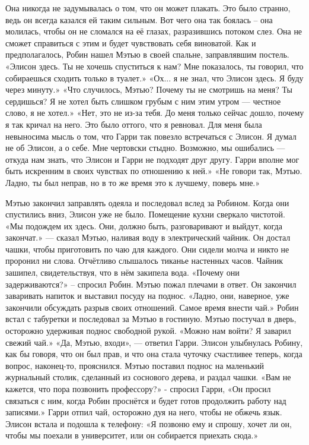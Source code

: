 \documentclass[a4paper,12pt]{book}
\begin{document}
	Она никогда не задумывалась о том, что он может плакать. Это было странно, ведь он всегда казался ей таким сильным. Вот чего она так боялась – она молилась, чтобы он не сломался на её глазах,  разразившись потоком слез. Она не сможет справиться с этим и будет чувствовать себя виноватой.
	Как и предполагалось, Робин нашел Мэтью в своей спальне, заправлявшим постель.
	«Элисон здесь. Ты не хочешь спуститься к нам? Мне показалось, ты говорил, что собираешься сходить только в туалет.»
	«Ох... я не знал, что Элисон здесь. Я буду через минуту.»
	«Что случилось, Мэтью? Почему ты не смотришь на меня? Ты сердишься? Я не хотел быть слишком грубым с ним этим утром — честное слово, я не хотел.»
	«Нет, это не из-за тебя. До меня только сейчас дошло, почему я так кричал на него. Это было оттого, что я ревновал. Для меня была невыносима мысль о том, что Гарри так повезло встречаться с Элисон. Я думал не об Элисон, а о себе. Мне чертовски стыдно. Возможно, мы ошибались — откуда нам знать, что Элисон и Гарри не подходят друг другу. Гарри вполне мог быть искренним в своих чувствах по отношению к ней.»
	«Не говори так, Мэтью. Ладно, ты был неправ, но в то же время это к лучшему, поверь мне.»
	
	Мэтью закончил заправлять одеяла и последовал вслед за Робином. Когда они спустились вниз, Элисон уже не было. Помещение кухни сверкало чистотой.	
	«Мы подождем их здесь. Они, должно быть, разговаривают и выйдут, когда закончат.» — сказал Мэтью, наливая воду в электрический чайник. Он достал чашки, чтобы приготовить по чаю для каждого. Они сидели молча и никто не проронил ни слова. Отчётливо слышалось тиканье настенных часов. Чайник зашипел, свидетельствуя, что в нём закипела вода.
	«Почему они задерживаются?» – спросил Робин. Мэтью пожал плечами в ответ. Он закончил заваривать напиток и выставил посуду на поднос.
	«Ладно, они, наверное, уже закончили обсуждать разрыв своих отношений. Самое время внести чай.»
	Робин встал с табуретки и последовал за Мэтью в гостиную. Мэтью постучал в дверь, осторожно удерживая поднос свободной рукой.
	«Можно нам войти? Я заварил свежий чай.»
	«Да, Мэтью, входи», — ответил Гарри.
	Элисон улыбнулась Робину, как бы говоря, что он был прав, и что она стала чуточку счастливее теперь, когда вопрос, наконец-то, прояснился. Мэтью поставил поднос на маленький журнальный столик, сделанный из соснового дерева, и раздал чашки.
	«Вам не кажется, что пора позвонить профессору?» - спросил Гарри, 
	«Он просил связаться с ним, когда Робин проснётся и будет готов продолжить работу над записями.»
	Гарри отпил чай, осторожно дуя на него, чтобы не обжечь язык.
	Элисон встала и подошла к телефону:
	«Я позвоню ему и спрошу, хочет ли он, чтобы мы поехали в университет, или он собирается приехать сюда.»
\end{document}
